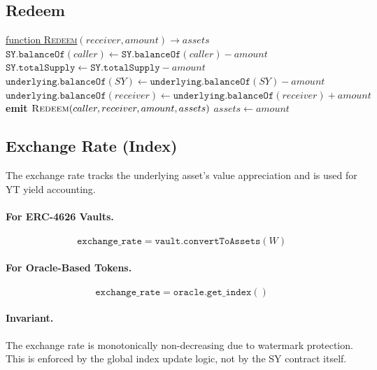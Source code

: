 \subsection{Redeem}

\begin{algorithm}[H]
\caption{SY Redeem}
\underline{function \textsc{Redeem}}$(receiver, amount) \rightarrow assets$\;
\BlankLine
$\texttt{SY.balanceOf}(caller) \gets \texttt{SY.balanceOf}(caller) - amount$\;
$\texttt{SY.totalSupply} \gets \texttt{SY.totalSupply} - amount$\;
$\texttt{underlying.balanceOf}(SY) \gets \texttt{underlying.balanceOf}(SY) - amount$\;
$\texttt{underlying.balanceOf}(receiver) \gets \texttt{underlying.balanceOf}(receiver) + amount$\;
\BlankLine
\textbf{emit} $\textsc{Redeem}(caller, receiver, amount, assets)$\;
\Return $assets \gets amount$\;
\BlankLine
{}
\end{algorithm}

\subsection{Exchange Rate (Index)}

The exchange rate tracks the underlying asset's value appreciation and is used for YT yield accounting.

\paragraph{For ERC-4626 Vaults.}
\[
\texttt{exchange\_rate} = \texttt{vault.convertToAssets}(W)
\]

\paragraph{For Oracle-Based Tokens.}
\[
\texttt{exchange\_rate} = \texttt{oracle.get\_index}()
\]

\paragraph{Invariant.} The exchange rate is monotonically non-decreasing due to watermark protection. This is enforced by the global index update logic, not by the SY contract itself.

